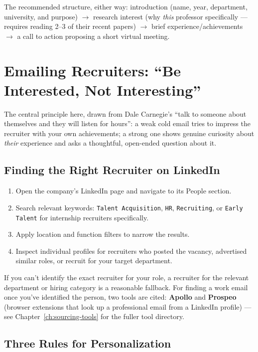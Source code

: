 \begin{keytakeaway}
The recommended structure, either way: introduction (name, year, department, university, and purpose) $\to$
research interest (why \emph{this} professor specifically — requires reading 2--3 of their recent papers) $\to$
brief experience/achievements $\to$ a call to action proposing a short virtual meeting.
\end{keytakeaway}

\section{Emailing Recruiters: ``Be Interested, Not Interesting''}

The central principle here, drawn from Dale Carnegie's ``talk to someone about themselves and they will listen
for hours'': a weak cold email tries to impress the recruiter with your own achievements; a strong one shows
genuine curiosity about \emph{their} experience and asks a thoughtful, open-ended question about it.

\subsection{Finding the Right Recruiter on LinkedIn}

\begin{enumerate}
  \item Open the company's LinkedIn page and navigate to its People section.
  \item Search relevant keywords: \texttt{Talent Acquisition}, \texttt{HR}, \texttt{Recruiting}, or \texttt{Early
  Talent} for internship recruiters specifically.
  \item Apply location and function filters to narrow the results.
  \item Inspect individual profiles for recruiters who posted the vacancy, advertised similar roles, or recruit
  for your target department.
\end{enumerate}

If you can't identify the exact recruiter for your role, a recruiter for the relevant department or hiring
category is a reasonable fallback. For finding a work email once you've identified the person, two tools are
cited: \textbf{Apollo} and \textbf{Prospeo} (browser extensions that look up a professional email from a
LinkedIn profile) — see Chapter~\ref{ch:sourcing-tools} for the fuller tool directory.

\subsection{Three Rules for Personalization}

